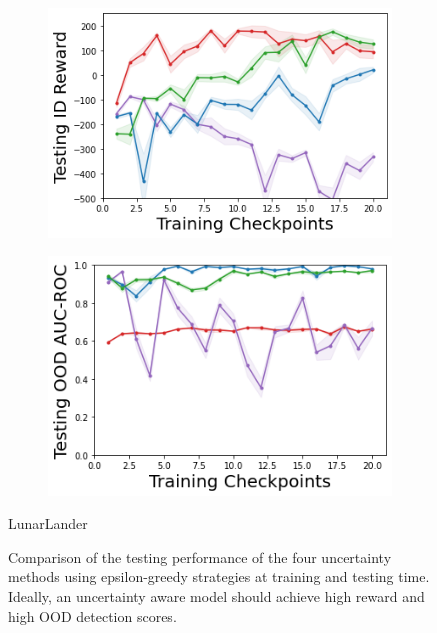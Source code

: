 \begin{figure}
    \begin{subfigure}{.4\textwidth}
        \includegraphics[width=\textwidth]{sections/011_icml2022/resources/LunarLander-v2-mean_reward_-testing-model.png}  
    \end{subfigure}
    \begin{subfigure}{.4\textwidth}
        \includegraphics[width=\textwidth]{sections/011_icml2022/resources/LunarLanderOOD-v0-AUC-ROC-epistemic_-testing-model.png}
    \end{subfigure}
        \vspace{-3mm}
    \caption*{LunarLander}
    \vspace{2mm}
    
    \caption{Comparison of the testing performance of the four uncertainty methods using epsilon-greedy strategies at training and testing time. Ideally, an uncertainty aware model should achieve high reward and high OOD detection scores.}
    \label{fig:model-testing-performance}
\end{figure}